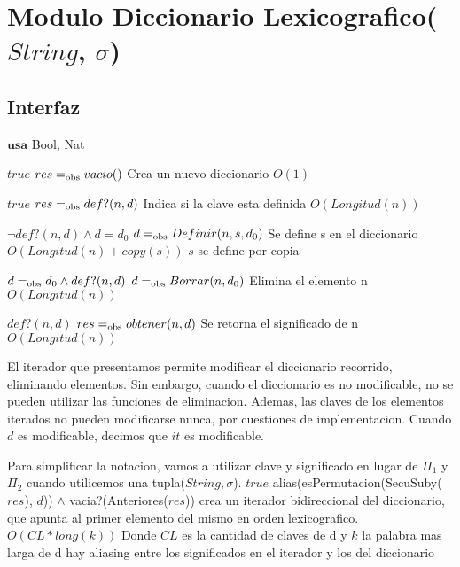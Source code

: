 \section{Modulo Diccionario Lexicografico($String$, $\sigma$)}

\subsection{Interfaz}

$\textbf{usa}$ Bool, Nat


 {$true$}
 {$res =_{\mathrm{obs}} vacio()$}
 {Crea un nuevo diccionario}
 {$O(1)$}
 {}

 
  {$true$}
  {$res =_{\mathrm{obs}} def?(n,d)$}
  {Indica si la clave esta definida}
  {$O(Longitud(n))$}
  {}

  {$\neg def?(n,d) \land d=d_0$}
  {$d =_{\mathrm{obs}} Definir(n, s, d_0)$}
  {Se define s en el diccionario}
  {$O(Longitud(n)+copy(s))$}
  {$s$ se define por copia}

 {$d =_{\mathrm{obs}} d_0 \land def?(n,d)$}
 {$d =_{\mathrm{obs}} Borrar(n,d_0)$}
 {Elimina el elemento n}
 {$O(Longitud(n))$}
 {}

 {$def?(n,d)$}
 {$res =_{\mathrm{obs}} obtener(n,d)$}
 {Se retorna el significado de n}
 {$O(Longitud(n))$}
 {}

 

  El iterador que presentamos permite modificar el diccionario recorrido, eliminando elementos.  Sin embargo, cuando el diccionario es no modificable, no se pueden utilizar las funciones de eliminacion.  Ademas, las claves de los elementos iterados no pueden modificarse nunca, por cuestiones de implementacion.  Cuando $d$ es modificable, decimos que $it$ es modificable.
  

  Para simplificar la notacion, vamos a utilizar clave y significado en lugar de $\Pi_1$ y $\Pi_2$ cuando utilicemos una tupla($String,\sigma$).
 {$true$}
 {alias(esPermutacion(SecuSuby($res$), $d$)) $\land$ vacia?(Anteriores($res$))}
 {crea un iterador bidireccional del diccionario, que apunta al primer elemento del mismo en orden lexicografico.}
  {$O(CL*long(k))$ Donde $CL$ es la cantidad de claves de d y $k$ la palabra mas larga de d}
  {hay aliasing entre los significados en el iterador y los del diccionario}


